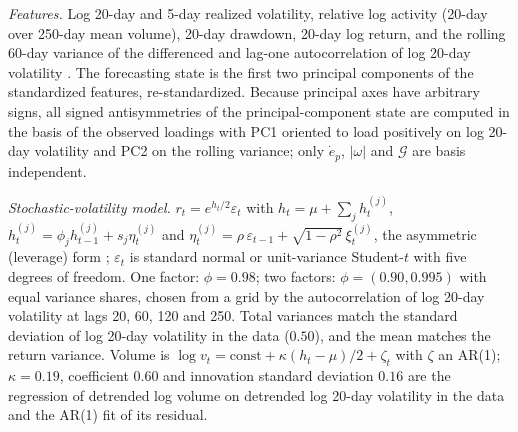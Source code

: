 \emph{Features.} Log 20-day and 5-day realized volatility, relative log activity (20-day over 250-day mean volume), 20-day drawdown, 20-day log return, and the rolling 60-day variance of the differenced and lag-one autocorrelation of log 20-day volatility \cite{dakos2012}. The forecasting state is the first two principal components of the standardized features, re-standardized. Because principal axes have arbitrary signs, all signed antisymmetries of the principal-component state are computed in the basis of the observed loadings with PC1 oriented to load positively on log 20-day volatility and PC2 on the rolling variance; only $\dot e_p$, $|\omega|$ and $\mathcal G$ are basis independent.

\emph{Stochastic-volatility model.} $r_t=e^{h_t/2}\varepsilon_t$ with $h_t=\mu+\sum_jh^{(j)}_t$, $h^{(j)}_t=\phi_jh^{(j)}_{t-1}+s_j\eta^{(j)}_t$ and $\eta^{(j)}_t=\rho\,\varepsilon_{t-1}+\sqrt{1-\rho^2}\,\xi^{(j)}_t$, the asymmetric (leverage) form \cite{harvey1996}; $\varepsilon_t$ is standard normal or unit-variance Student-$t$ with five degrees of freedom. One factor: $\phi=0.98$; two factors: $\phi=(0.90,0.995)$ with equal variance shares, chosen from a grid by the autocorrelation of log 20-day volatility at lags 20, 60, 120 and 250. Total variances match the standard deviation of log 20-day volatility in the data ($0.50$), and the mean matches the return variance. Volume is $\log v_t=\mathrm{const}+\kappa(h_t-\mu)/2+\zeta_t$ with $\zeta$ an AR(1); $\kappa=0.19$, coefficient $0.60$ and innovation standard deviation $0.16$ are the regression of detrended log volume on detrended log 20-day volatility in the data and the AR(1) fit of its residual.
